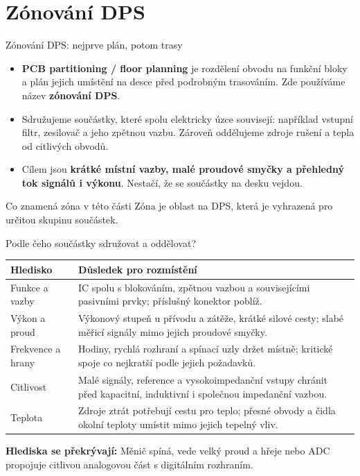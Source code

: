 \documentclass{beamer}
\begin{document}
\section{\texorpdfstring{Zónování DPS}{Zonovani DPS}}
\begin{frame}[t]{Zónování DPS: nejprve plán, potom trasy}
	\small
	\begin{itemize}
		\item \textbf{PCB partitioning / floor planning} je rozdělení obvodu na funkční bloky a plán jejich umístění na desce před podrobným trasováním. Zde používáme název \textbf{zónování DPS}.
		\item Sdružujeme součástky, které spolu elektricky úzce souvisejí: například vstupní filtr, zesilovač a jeho zpětnou vazbu. Zároveň oddělujeme zdroje rušení a tepla od citlivých obvodů.
		\item Cílem jsou \textbf{krátké místní vazby, malé proudové smyčky a přehledný tok signálů i výkonu}. Nestačí, že se součástky na desku vejdou.
	\end{itemize}
	\begin{block}{Co znamená zóna v této části}
	Zóna je oblast na DPS, která je vyhrazená pro určitou skupinu součástek.
	\end{block}
\end{frame}

\begin{frame}[t]{Podle čeho součástky sdružovat a oddělovat?}
	\footnotesize
	\begin{tabular}{>{\raggedright\arraybackslash}p{.20\linewidth}|>{\raggedright\arraybackslash}p{.72\linewidth}}
		\textbf{Hledisko} & \textbf{Důsledek pro rozmístění}\\\hline
		Funkce a vazby & IC spolu s blokováním, zpětnou vazbou a souvisejícími pasivními prvky; příslušný konektor poblíž.\\[5ex]
		Výkon a proud & Výkonový stupeň u přívodu a zátěže, krátké silové cesty; slabé měřicí signály mimo jejich proudové smyčky.\\[5ex]
		Frekvence a hrany & Hodiny, rychlá rozhraní a spínací uzly držet místně; kritické spoje co nejkratší podle jejich požadavků.\\[5ex]
		Citlivost & Malé signály, reference a vysokoimpedanční vstupy chránit před kapacitní, induktivní i společnou impedanční vazbou.\\[5ex]
		Teplota & Zdroje ztrát potřebují cestu pro teplo; přesné obvody a čidla okolní teploty umístit mimo jejich tepelný vliv.
	\end{tabular}
  
	\vspace{5mm}
	\textbf{Hlediska se překrývají:} Měnič spíná, vede velký proud a hřeje nebo ADC propojuje citlivou analogovou část s digitálním rozhraním.
\end{frame}
\end{document}
